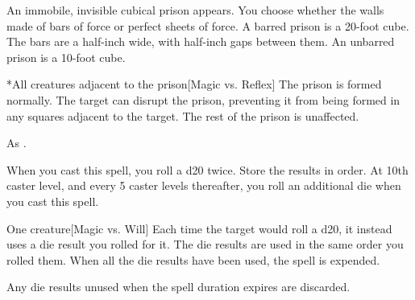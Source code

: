 \begin{spellheader}
    \spellrng{\rngmed}
    \spelldur{\durlong \dismissable}
\end{spellheader}
\begin{spelleffects}
    \spellline
    \spelleffect An immobile, invisible cubical prison appears. You choose whether the walls made of bars of force or perfect sheets of force. A barred prison is a 20-foot cube. The bars are a half-inch wide, with half-inch gaps between them. An unbarred prison is a 10-foot cube.
    \begin{spelltarget}*{All creatures adjacent to the prison}[Magic vs. Reflex]
        \spellsuccess The prison is formed normally.
        \spellfailure The target can disrupt the prison, preventing it from being formed in any squares adjacent to the target. The rest of the prison is unaffected.
    \end{spelltarget}
\end{spelleffects}
\begin{spellfooter}
    \spellnotes As .
\end{spellfooter}

\begin{spellheader}
    \spellrng{\rngmed}
    \spellspecial When you cast this spell, you roll a d20 twice. Store the results in order. At 10th caster level, and every 5 caster levels thereafter, you roll an additional die when you cast this spell.
\end{spellheader}
\begin{spelleffects}
    \begin{spelltarget}{One creature}[Magic vs. Will]
        \spellsuccess Each time the target would roll a d20, it instead uses a die result you rolled for it. The die results are used in the same order you rolled them. When all the die results have been used, the spell is expended.
    \end{spelltarget}
\end{spelleffects}
\begin{spellfooter}
    \spellnotes Any die results unused when the spell duration expires are discarded.
\end{spellfooter}

